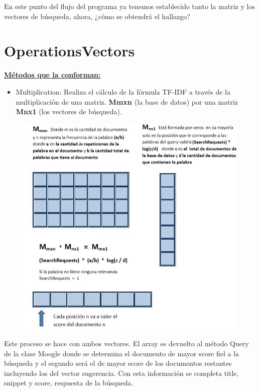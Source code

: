 \documentclass[12pt, letterpaper]{article}
\begin{document}
En este punto del flujo del programa ya tenemos establecido tanto la matriz y los vectores de búsqueda, ahora, ¿cómo se obtendrá el hallazgo? 
 
 
\section{OperationsVectors}
\textbf{\underline{Métodos que la conforman: }} 

\begin{itemize}
    \item Multiplication: Realiza el cálculo de la fórmula TF-IDF a través de la multiplicación de una matriz. \textbf {M{\tiny mxn }} (la base de datos) por una matriz \textbf {M{\tiny nx1}} (los vectores de búsqueda).\\
\end{itemize}

\begin{figure}[h]
    \includegraphics[scale= 0.5]{tres.jpg}
\end{figure}
 
Este proceso se  hace con ambos vectores. El array es devuelto al método Query de la clase Moogle donde se determina el documento de mayor score fiel a la búsqueda y el segundo será el de mayor score de los documentos restantes incluyendo los del vector sugerencia. Con esta información  se completa title, snippet y score, respuesta de la búsqueda. 
\end{document}
